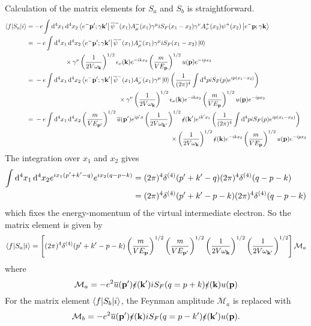 Calculation of the matrix elements for $S_a$ and $S_b$ is straightforward.
\begin{align*}
\braket[S_a]{f}{i} &= - e \int \diff{^4x_1}\diff{^4x_2} \bra{e^-\vec{p}'; \gamma\vec{k}'}\overline{\psi}^-(x_1)A^-_\mu(x_1) \gamma^\mu iS_F(x_1-x_2)\gamma^\nu A^+_\nu(x_2)\psi^+(x_2)\ket{e^-\vec{p}; \gamma\vec{k}} \\
&= {} \!\begin{multlined}[t][.7\displaywidth] - e \int \diff{^4x_1}\diff{^4x_2} \bra{e^-\vec{p}'; \gamma\vec{k}'}\overline{\psi}^-(x_1)A^-_\mu(x_1)\gamma^\mu iS_F(x_1-x_2)\ket{0} \\
\times\gamma^\nu \left(\frac{1}{2V\omega_{\vec{k}}}\right)^{1/2}\epsilon_{\nu}(\vec{k})e^{-ikx_2}\left(\frac{m}{VE_{\vec{p}}}\right)^{1/2}u(\vec{p})e^{-ipx_2}\end{multlined} \\
&= {} \!\begin{multlined}[t][.7\displaywidth] - e \int \diff{^4x_1}\diff{^4x_2} \bra{e^-\vec{p}'; \gamma\vec{k}'}\overline{\psi}^-(x_1)A^-_\mu(x_1)\gamma^\mu \ket{0} \left(\frac{1}{(2\pi)^4}\int \diff{^4p}iS_F(p)e^{ip(x_1-x_2)}\right) \\
\times\gamma^\nu \left(\frac{1}{2V\omega_{\vec{k}}}\right)^{1/2}\epsilon_{\nu}(\vec{k})e^{-ikx_2}\left(\frac{m}{VE_{\vec{p}}}\right)^{1/2}u(\vec{p})e^{-ipx_2}\end{multlined} \\
&= {} \!\begin{multlined}[t][.7\displaywidth] - e \int \diff{^4x_1}\diff{^4x_2} \left(\frac{m}{VE_{\vec{p}'}}\right)^{1/2}\overline{u}(\vec{p}')e^{ip'x} \left(\frac{1}{2V\omega_{\vec{k}'}}\right)^{1/2}\slashed{\epsilon}(\vec{k}')e^{ik'x_1} \left(\frac{1}{(2\pi)^4}\int \diff{^4p}iS_F(p)e^{ip(x_1-x_2)}\right) \\
\times\left(\frac{1}{2V\omega_{\vec{k}}}\right)^{1/2}\slashed{\epsilon}(\vec{k})e^{-ikx_2}\left(\frac{m}{VE_{\vec{p}}}\right)^{1/2}u(\vec{p})e^{-ipx_2}\end{multlined}
\end{align*}
The integration over $x_1$ and $x_2$ gives
\begin{align*}
\int \diff{^4x_1}\diff{^4x_2}e^{ix_1(p'+k'-q)}e^{ix_2(q-p-k)} &= (2\pi)^4\delta^{(4)}(p'+k'-q)(2\pi)^4\delta^{(4)}(q-p-k) \\
&= (2\pi)^4\delta^{(4)}(p'+k'-p-k)(2\pi)^4\delta^{(4)}(q-p-k)
\end{align*}
which fixes the energy-momentum of the virtual intermediate electron. So the matrix element is given by
\[ \braket[S_a]{f}{i} = \left[(2\pi)^4\delta^{(4)}(p'+k'-p-k)\left(\frac{m}{VE_{\vec{p}}}\right)^{1/2}\left(\frac{m}{VE_{\vec{p}'}}\right)^{1/2}\left(\frac{1}{2V\omega_{\vec{k}}}\right)^{1/2}\left(\frac{1}{2V\omega_{\vec{k}'}}\right)^{1/2}\right]\mathcal{M}_a \]
where
\[ \mathcal{M}_a = -e^2 \overline{u}(\vec{p}')\slashed{\epsilon}(\vec{k}')iS_F(q=p+k)\slashed{\epsilon}(\vec{k})u(\vec{p}) \]
For the matrix element $\braket[S_b]{f}{i}$, the Feynman amplitude $\mathcal{M}_a$ is replaced with
\[ \mathcal{M}_b = -e^2 \overline{u}(\vec{p}')\slashed{\epsilon}(\vec{k})iS_F(q=p-k')\slashed{\epsilon}(\vec{k}')u(\vec{p}). \]

